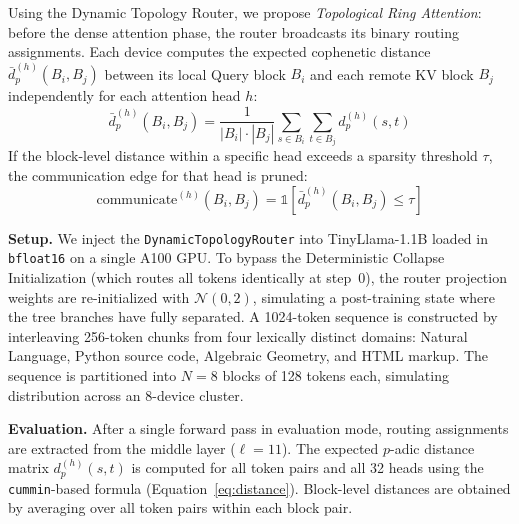 \documentclass[11pt,a4paper]{article}
\begin{document}
Using the Dynamic Topology Router, we propose \emph{Topological Ring Attention}: before the dense attention phase, the router broadcasts its binary routing assignments. Each device computes the expected cophenetic distance $\bar{d}_p^{(h)}(B_i, B_j)$ between its local Query block $B_i$ and each remote KV block $B_j$ independently for each attention head $h$:
\begin{equation}
    \bar{d}_p^{(h)}(B_i, B_j) = \frac{1}{|B_i| \cdot |B_j|} \sum_{s \in B_i} \sum_{t \in B_j} d_p^{(h)}(s,t)
    \label{eq:block_dist}
\end{equation}
If the block-level distance within a specific head exceeds a sparsity threshold $\tau$, the communication edge for that head is pruned:
\begin{equation}
    \text{communicate}^{(h)}(B_i, B_j) = \mathbb{1}\!\left[\bar{d}_p^{(h)}(B_i, B_j) \leq \tau\right]
    \label{eq:prune}
\end{equation}

\textbf{Setup.} We inject the \texttt{DynamicTopologyRouter} into TinyLlama-1.1B loaded in \texttt{bfloat16} on a single A100 GPU. To bypass the Deterministic Collapse Initialization (which routes all tokens identically at step~0), the router projection weights are re-initialized with $\mathcal{N}(0, 2)$, simulating a post-training state where the tree branches have fully separated. A 1024-token sequence is constructed by interleaving 256-token chunks from four lexically distinct domains: Natural Language, Python source code, Algebraic Geometry, and HTML markup. The sequence is partitioned into $N = 8$ blocks of 128 tokens each, simulating distribution across an 8-device cluster.

\textbf{Evaluation.} After a single forward pass in evaluation mode, routing assignments are extracted from the middle layer ($\ell = 11$). The expected $p$-adic distance matrix $d_p^{(h)}(s, t)$ is computed for all token pairs and all 32 heads using the \texttt{cummin}-based formula (Equation~\ref{eq:distance}). Block-level distances are obtained by averaging over all token pairs within each block pair.
\end{document}
